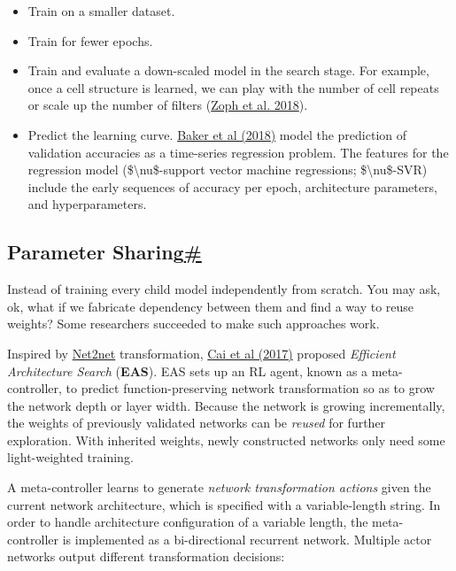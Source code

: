 \begin{itemize}
\tightlist
\item
  Train on a smaller dataset.
\item
  Train for fewer epochs.
\item
  Train and evaluate a down-scaled model in the search stage. For example, once a cell structure is learned, we can play with the number of cell repeats or scale up the number of filters (\href{https://arxiv.org/abs/1707.07012}{Zoph et al. 2018}).
\item
  Predict the learning curve. \href{https://arxiv.org/abs/1705.10823}{Baker et al (2018)} model the prediction of validation accuracies as a time-series regression problem. The features for the regression model (\$\textbackslash nu\$-support vector machine regressions; \$\textbackslash nu\$-SVR) include the early sequences of accuracy per epoch, architecture parameters, and hyperparameters.
\end{itemize}

\subsection{\texorpdfstring{Parameter Sharing\hyperref[parameter-sharing]{\#}}{Parameter Sharing\#}}\label{parameter-sharing}

Instead of training every child model independently from scratch. You may ask, ok, what if we fabricate dependency between them and find a way to reuse weights? Some researchers succeeded to make such approaches work.

Inspired by \href{https://arxiv.org/abs/1511.05641}{Net2net} transformation, \href{https://arxiv.org/abs/1707.04873}{Cai et al (2017)} proposed \emph{Efficient Architecture Search} (\textbf{EAS}). EAS sets up an RL agent, known as a meta-controller, to predict function-preserving network transformation so as to grow the network depth or layer width. Because the network is growing incrementally, the weights of previously validated networks can be \emph{reused} for further exploration. With inherited weights, newly constructed networks only need some light-weighted training.

A meta-controller learns to generate \emph{network transformation actions} given the current network architecture, which is specified with a variable-length string. In order to handle architecture configuration of a variable length, the meta-controller is implemented as a bi-directional recurrent network. Multiple actor networks output different transformation decisions:

